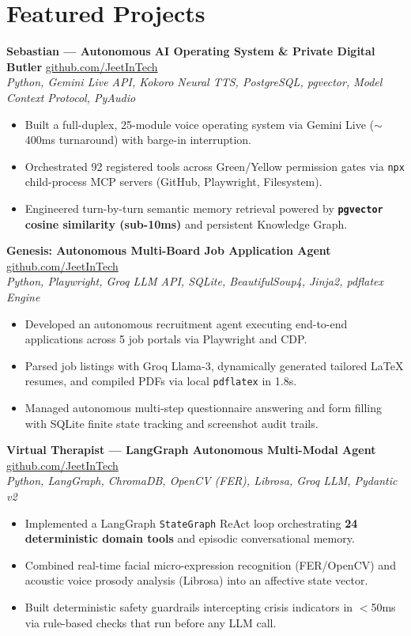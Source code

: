 \documentclass[10pt]{article}
\begin{document}
\section*{Featured Projects}
\textbf{Sebastian — Autonomous AI Operating System \& Private Digital Butler} \hfill \href{https://github.com/JeetInTech}{github.com/JeetInTech} \\
\textit{Python, Gemini Live API, Kokoro Neural TTS, PostgreSQL, pgvector, Model Context Protocol, PyAudio}
\begin{itemize}
    \item Built a full-duplex, 25-module voice operating system via Gemini Live ($\sim$400ms turnaround) with barge-in interruption.
    \item Orchestrated 92 registered tools across Green/Yellow permission gates via \texttt{npx} child-process MCP servers (GitHub, Playwright, Filesystem).
    \item Engineered turn-by-turn semantic memory retrieval powered by \textbf{\texttt{pgvector} cosine similarity (sub-10ms)} and persistent Knowledge Graph.
\end{itemize}

\vspace{1.5pt}
\textbf{Genesis: Autonomous Multi-Board Job Application Agent} \hfill \href{https://github.com/JeetInTech}{github.com/JeetInTech} \\
\textit{Python, Playwright, Groq LLM API, SQLite, BeautifulSoup4, Jinja2, pdflatex Engine}
\begin{itemize}
    \item Developed an autonomous recruitment agent executing end-to-end applications across 5 job portals via Playwright and CDP.
    \item Parsed job listings with Groq Llama-3, dynamically generated tailored LaTeX resumes, and compiled PDFs via local \texttt{pdflatex} in 1.8s.
    \item Managed autonomous multi-step questionnaire answering and form filling with SQLite finite state tracking and screenshot audit trails.
\end{itemize}

\vspace{1.5pt}
\textbf{Virtual Therapist — LangGraph Autonomous Multi-Modal Agent} \hfill \href{https://github.com/JeetInTech}{github.com/JeetInTech} \\
\textit{Python, LangGraph, ChromaDB, OpenCV (FER), Librosa, Groq LLM, Pydantic v2}
\begin{itemize}
    \item Implemented a LangGraph \texttt{StateGraph} ReAct loop orchestrating \textbf{24 deterministic domain tools} and episodic conversational memory.
    \item Combined real-time facial micro-expression recognition (FER/OpenCV) and acoustic voice prosody analysis (Librosa) into an affective state vector.
    \item Built deterministic safety guardrails intercepting crisis indicators in $<$50ms via rule-based checks that run before any LLM call.
\end{itemize}
\end{document}
